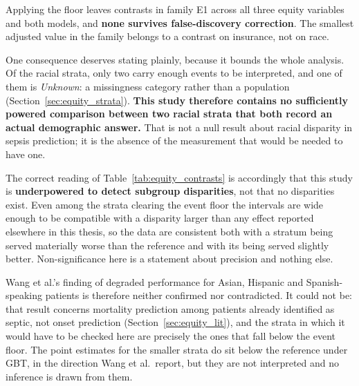 \begin{table}[H]
    \centering\footnotesize
    
    \caption{Subgroup AUROC differences against the reference level, for the
    racial strata clearing the \pcMinSubgroupEvents{}-event floor.
    $q_{\text{BH}}$ is the Benjamini--Hochberg adjusted $p$-value over
    exploratory family E1, which contains all \pcEquityNContrastsEOne{} eligible
    subgroup contrasts across race, language and insurance for both models,
    not only those shown here. \textbf{No racial contrast is significant.}
    The reference level is the largest stratum of its own variable and is a
    residual administrative category, not a population
    (Section~\ref{sec:equity_strata}). \textbf{[E] exploratory.}}
    \label{tab:equity_contrasts}
\end{table}

Applying the floor leaves \pcEquityNContrastsEOne{} contrasts in family E1
across all three equity variables and both models, and \textbf{none survives
false-discovery correction}. The smallest adjusted value in the family belongs
to a contrast on insurance, not on race.

One consequence deserves stating plainly, because it bounds the whole analysis.
Of the racial strata, only two carry enough events to be interpreted, and one of
them is \emph{Unknown}: a missingness category rather than a population
(Section~\ref{sec:equity_strata}). \textbf{This study therefore contains no
sufficiently powered comparison between two racial strata that both record an
actual demographic answer.} That is not a null result about racial disparity in
sepsis prediction; it is the absence of the measurement that would be needed to
have one.

The correct reading of Table~\ref{tab:equity_contrasts} is accordingly that this
study is \textbf{underpowered to detect subgroup disparities}, not that no
disparities exist. Even among the strata clearing the event floor the intervals
are wide enough to be compatible with a disparity larger than any effect
reported elsewhere in this thesis, so the data are consistent both with a
stratum being served materially worse than the reference and with its being
served slightly better. Non-significance here is a statement about precision and
nothing else.

Wang et al.'s \cite{wang2022equity} finding of degraded performance for Asian,
Hispanic and Spanish-speaking patients is therefore neither confirmed nor
contradicted. It could not be: that result concerns mortality prediction among
patients already identified as septic, not onset prediction
(Section~\ref{sec:equity_lit}), and the strata in which it would have to be
checked here are precisely the ones that fall below the event floor. The point
estimates for the smaller strata do sit below the reference under GBT, in the
direction Wang et al.\ report, but they are not interpreted and no inference is
drawn from them.

